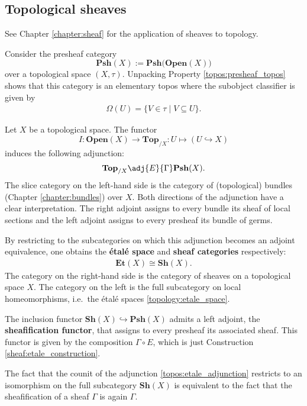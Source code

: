 \subsection{Topological sheaves}

    See Chapter \ref{chapter:sheaf} for the application of sheaves to topology.

    \begin{property}\label{topos:sheaf_topos}
        Consider the presheaf category \[\mathbf{Psh}(X):=\mathbf{Psh(Open}(X))\] over a topological space $(X,\tau)$. Unpacking Property \ref{topos:presheaf_topos} shows that this category is an elementary topos where the subobject classifier is given by
        \begin{gather}
            \Omega(U) = \{V\in\tau\mid V\subseteq U\}.
        \end{gather}
    \end{property}

    \begin{construct}\label{topos:etale_adjunction}
        Let $X$ be a topological space. The functor \[I:\mathbf{Open}(X)\rightarrow\mathbf{Top}_{/X}:U\mapsto(U\hookrightarrow X)\] induces the following adjunction:
        \begin{gather}
            \mathbf{Top}_{/X}\adj{E}{\Gamma}\mathbf{Psh}(X).
        \end{gather}
        The slice category on the left-hand side is the category of (topological) bundles (Chapter \ref{chapter:bundles}) over $X$. Both directions of the adjunction have a clear interpretation. The right adjoint assigns to every bundle its sheaf of local sections and the left adjoint assigns to every presheaf its bundle of germs.

        By restricting to the subcategories on which this adjunction becomes an adjoint equivalence, one obtains     the \textbf{\'etal\'e space} and \textbf{sheaf categories} respectively:
        \begin{gather}
            \mathbf{Et}(X)\cong\mathbf{Sh}(X).
        \end{gather}
        The category on the right-hand side is the category of sheaves on a topological space $X$. The category on the left is the full subcategory on local homeomorphisms, i.e.~the \'etal\'e spaces \ref{topology:etale_space}.
    \end{construct}

    \begin{property}
        The inclusion functor $\mathbf{Sh}(X)\hookrightarrow\mathbf{Psh}(X)$ admits a left adjoint, the \textbf{sheafification functor}, that assigns to every presheaf its associated sheaf. This functor is given by the composition $\Gamma\circ E$, which is just Construction \ref{sheaf:etale_construction}.

        The fact that the counit of the adjunction \ref{topos:etale_adjunction} restricts to an isomorphism on the full subcategory $\mathbf{Sh}(X)$ is equivalent to the fact that the sheafification of a sheaf $\Gamma$ is again $\Gamma$.
    \end{property}

